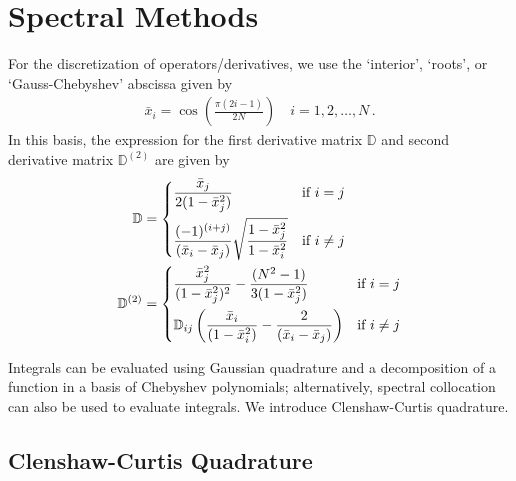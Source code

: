 \documentclass[11pt,letterpaper]{article}
\begin{document}


\section{Spectral Methods}
\label{s: spectral methods}
For the discretization of operators/derivatives, we use the `interior', `roots', or `Gauss-Chebyshev' abscissa given by
\begin{align}
	\bar x_i = \cos \left( \frac{\pi (2i - 1)}{2N} \right) \quad i = 1,2,\ldots,N \, .
\end{align}
In this basis, the expression for the first derivative matrix $\mathbb{D}$ and second derivative matrix $\mathbb{D}^{(2)}$ are given by
\begin{align}
	\mathbb{D} &= \begin{dcases}
		\frac{\bar x_j}{2(1 - \bar x_j^2)} & \text{if } i = j\\
		\frac{(-1)^{(i+j)}}{(\bar x_i - \bar x_j)} \sqrt{\frac{1 - \bar x_j^2}{1 - \bar x_i^2}} & \text{if } i \neq j
	\end{dcases} \\
	\mathbb{D}^{(2)} &= \begin{dcases}
		\frac{\bar x_j^2}{(1- \bar x_j^2)^2} - \frac{(N^2 - 1)}{3(1 - \bar x_j^2)} & \text{if } i = j \\
		\mathbb{D}_{ij} \left(\frac{\bar x_i}{(1-\bar x_i^2)} - \frac{2}{(\bar x_i - \bar x_j)} \right) & \text{if } i \neq j
	\end{dcases}
\end{align}

Integrals can be evaluated using Gaussian quadrature and a decomposition of a function in a basis of Chebyshev polynomials; alternatively, spectral collocation can also be used to evaluate integrals. We introduce Clenshaw-Curtis quadrature.

\subsection{Clenshaw-Curtis Quadrature}
\end{document}
